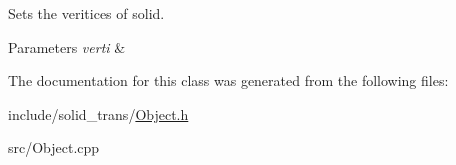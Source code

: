 Sets the veritices of solid. 


\begin{DoxyParams}{Parameters}
{\em verti} & \\
\hline
\end{DoxyParams}


The documentation for this class was generated from the following files\+:\begin{DoxyCompactItemize}
\item 
include/solid\+\_\+trans/\hyperlink{Object_8h}{Object.\+h}\item 
src/Object.\+cpp\end{DoxyCompactItemize}
